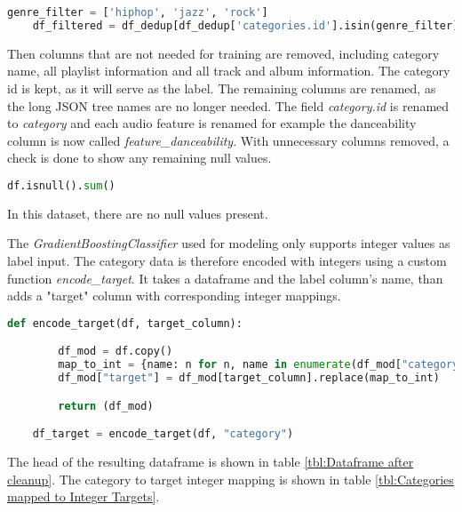 \begin{lstlisting}[language=Python]
    genre_filter = ['hiphop', 'jazz', 'rock']
    df_filtered = df_dedup[df_dedup['categories.id'].isin(genre_filter)]
\end{lstlisting}

Then columns that are not needed for training are removed, including category name, all playlist information and
all track and album information. The category id is kept, as it will serve as the label.
The remaining columns are renamed, as the long JSON tree names are no longer needed.
The field \emph{category.id} is renamed to \emph{category} and each audio feature is renamed for example 
the danceability column is now called \emph{feature\_danceability}.
With unnecessary columns removed, a check is done to show any remaining null values.

\begin{lstlisting}[language=Python]
    df.isnull().sum()
\end{lstlisting}

In this dataset, there are no null values present.

The \emph{GradientBoostingClassifier} used for modeling only supports integer values as label input.
The category data is therefore encoded with integers using a custom function \emph{encode\_target}.
It takes a dataframe and the label column's name, than adds a "target" column with corresponding integer mappings.

\begin{lstlisting}[language=Python]
    def encode_target(df, target_column):

        df_mod = df.copy()
        map_to_int = {name: n for n, name in enumerate(df_mod["category"].unique())}
        df_mod["target"] = df_mod[target_column].replace(map_to_int)

        return (df_mod)

    df_target = encode_target(df, "category")
\end{lstlisting}

The head of the resulting dataframe is shown in table \ref{tbl:Dataframe after cleanup}.
The category to target integer mapping is shown in table \ref{tbl:Categories mapped to Integer Targets}.

